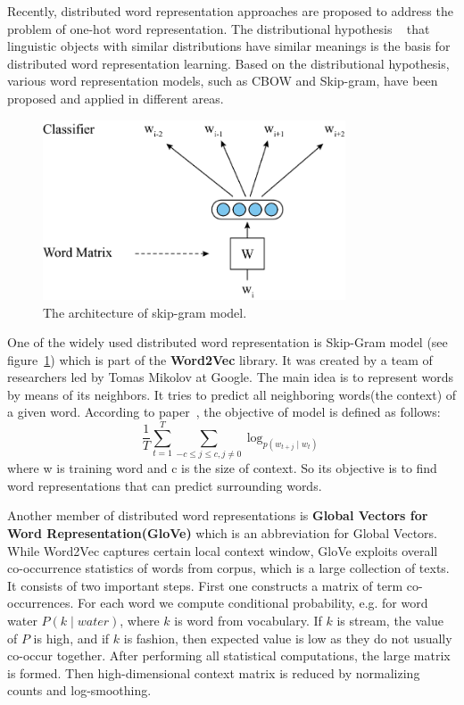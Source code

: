 Recently, distributed word representation approaches are proposed to address the problem of one-hot word representation. The distributional hypothesis ~\cite{bojanowski2017enriching} that linguistic objects with similar distributions have similar meanings is the basis for distributed word representation learning. Based on the distributional hypothesis, various word representation models, such as CBOW and Skip-gram, have been proposed and applied in different areas.


\begin{figure}[!htbp]
	\centering
	\includegraphics[width = 0.8\textwidth]{figures/skip-gram-model.png}
	\caption[The architecture of skip-gram model]
	{ The architecture of skip-gram model.}
	\label{fig:skip-gram-model}
\end{figure}

One of the widely used distributed word representation is Skip-Gram model (see figure~\ref{fig:skip-gram-model}) which is part of the \textbf{Word2Vec} library. It was created by a team of researchers led by Tomas Mikolov at Google. The main idea is to represent words by means of its neighbors. It tries to predict all neighboring words(the context) of a given word. According to paper~\cite{mikolov2013distributed}, the objective of model is defined as follows:$$\frac{1}{T}\sum_{t=1}^{T}\sum_{-c\le j\le c,j\ne 0} \log_{ p(w_{t+j}\mid w_t) }$$
where w is training word and c is the size of context. So its objective is to find word representations that can predict surrounding words.

Another member of distributed word representations is \textbf{Global Vectors for Word Representation(GloVe)} which is an abbreviation for Global Vectors. While Word2Vec captures certain local context window, GloVe exploits overall co-occurrence statistics of words from corpus, which is a large collection of texts. It consists of two important steps. First one constructs a matrix of term co-occurrences. For each word we compute conditional probability, e.g. for word water $ P(k\mid water) $, where $ k $ is word from vocabulary. If $ k $ is stream, the value of $ P $ is high, and if $ k $ is fashion, then expected value is low as they do not usually co-occur together. After performing all statistical computations, the large matrix is formed. Then high-dimensional context matrix is reduced by normalizing counts and log-smoothing.


